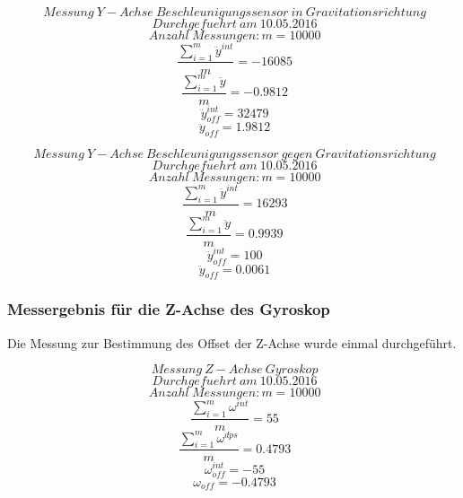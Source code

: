 \documentclass{article}
\begin{document}
\[\ Messung \ Y-Achse \ Beschleunigungssensor \ in \ Gravitationsrichtung \]
\[\ Durchgefuehrt \ am \ 10.05.2016 \]
\[\ Anzahl \ Messungen : m = 10000 \]
\[\ \frac{\sum_{i = 1}^{m} \ddot{y}^{int}}{m} = -16085 \]
\[\ \frac{\sum_{i = 1}^{m} \ddot{y}}{m} = -0.9812 \]
\[\ \ddot{y}_{off}^{int} = 32479 \]
\[\ \ddot{y}_{off} = 1.9812 \]


\[\ Messung \ Y-Achse \ Beschleunigungssensor \ gegen \ Gravitationsrichtung \]
\[\ Durchgefuehrt \ am \ 10.05.2016 \]
\[\ Anzahl \ Messungen : m = 10000 \]
\[\ \frac{\sum_{i = 1}^{m} \ddot{y}^{int}}{m} = 16293 \]
\[\ \frac{\sum_{i = 1}^{m} \ddot{y}}{m} = 0.9939 \]
\[\ \ddot{y}_{off}^{int} = 100 \]
\[\ \ddot{y}_{off} = 0.0061 \]

\subsubsection{Messergebnis für die Z-Achse des Gyroskop}
Die Messung zur Bestimmung des Offset der Z-Achse wurde einmal durchgeführt.

\[\ Messung \ Z-Achse \ Gyroskop\]
\[\ Durchgefuehrt \ am \ 10.05.2016 \]
\[\ Anzahl \ Messungen : m = 10000 \]
\[\ \frac{\sum_{i = 1}^{m} {\omega}^{int}}{m} = 55 \]
\[\ \frac{\sum_{i = 1}^{m} {\omega}^{dps}}{m} = 0.4793 \]
\[\ {\omega}_{off}^{int} = -55 \]
\[\ {\omega}_{off} = -0.4793 \]
\end{document}
